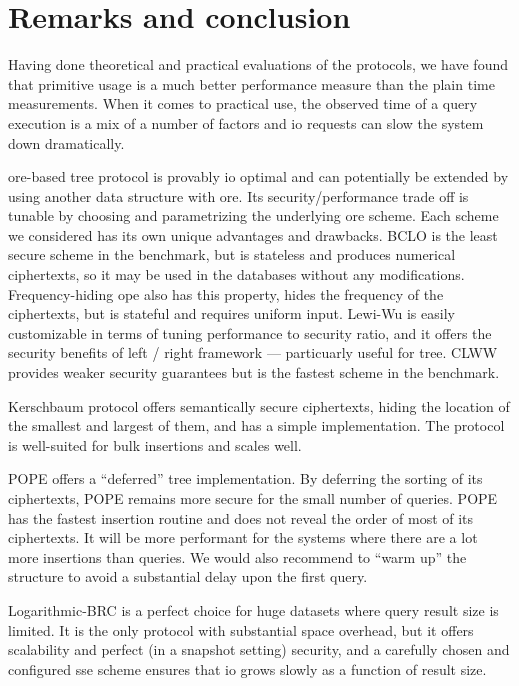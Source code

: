 \section{Remarks and conclusion}\label{section:range-snapshot:conclusion}

	Having done theoretical and practical evaluations of the protocols, we have found that primitive usage is a much better performance measure than the plain time measurements.
	When it comes to practical use, the observed time of a query execution is a mix of a number of factors and \acrshort{io} requests can slow the system down dramatically.

	\acrshort{ore}-based {\BPlus} tree protocol is provably \acrshort{io} optimal and can potentially be extended by using another data structure with \acrshort{ore}.
	Its security/performance trade off is tunable by choosing and parametrizing the underlying \acrshort{ore} scheme.
	Each scheme we considered has its own unique advantages and drawbacks.
	BCLO \cite{bclo-ope} is the least secure scheme in the benchmark, but is stateless and produces numerical ciphertexts, so it may be used in the databases without any modifications.
	Frequency-hiding \acrshort{ope} \cite{fh-ope} also has this property, hides the frequency of the ciphertexts, but is stateful and requires uniform input.
	Lewi-Wu \cite{lewi-wu-ore} is easily customizable in terms of tuning performance to security ratio, and it offers the security benefits of left / right framework --- particuarly useful for {\BPlus} tree.
	CLWW \cite{clww-ore} provides weaker security guarantees but is the fastest scheme in the benchmark.

	Kerschbaum protocol \cite{florian-protocol} offers semantically secure ciphertexts, hiding the location of the smallest and largest of them, and has a simple implementation.
	The protocol is well-suited for bulk insertions and scales well.

	POPE \cite{pope} offers a ``deferred'' {\BPlus} tree implementation.
	By deferring the sorting of its ciphertexts, POPE remains more secure for the small number of queries.
	POPE has the fastest insertion routine and does not reveal the order of most of its ciphertexts.
	It will be more performant for the systems where there are a lot more insertions than queries.
	We would also recommend to ``warm up'' the structure to avoid a substantial delay upon the first query.

	Logarithmic-BRC is a perfect choice for huge datasets where query result size is limited.
	It is the only protocol with substantial space overhead, but it offers scalability and perfect (in a snapshot setting) security,
	and a carefully chosen and configured \acrshort{sse} scheme ensures that \acrshort{io} grows slowly as a function of result size.

